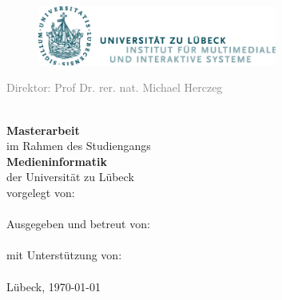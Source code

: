 \begin{titlepage}
    \begin{figure}[t]
        \centering
        \includegraphics[width=0.7\textwidth]{img/UzL_Logo.png}
    \end{figure}

    \begin{center}
        \selectfont
        \textcolor{gray}{Direktor: Prof Dr. rer. nat. Michael Herczeg}\\
        \vspace*{1.5cm}
        \Large
        \begin{onehalfspace}
            \textbf{\titelMA}
        \end{onehalfspace}
        \vspace{0.5cm}
        \titelMAEnglish\\
        \vspace{1cm}
        \normalsize
        \textbf{Masterarbeit}\\
        \vspace{0.2cm}
        im Rahmen des Studiengangs\\
        \textbf{Medieninformatik}\\
        der Universität zu Lübeck\\
        \vspace{1cm}
        vorgelegt von:\\ \textbf{\authorMA}\\
        \vspace{1cm}
        Ausgegeben und betreut von:\\ \textbf{\examinerMA}\\
        \vspace{0.5cm}
        mit Unterstützung von:\\ \textbf{\supporterMA}\\
        
        \vspace{1cm}
        Lübeck, \today
    \end{center}        
\end{titlepage}